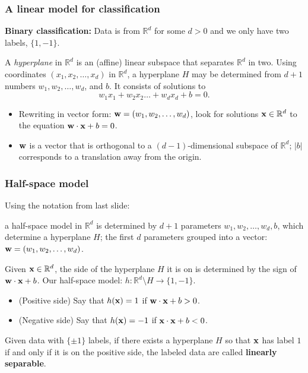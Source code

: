 \documentclass{beamer}
\theoremstyle{example}
\begin{document}
\begin{frame}
    \frametitle{A linear model for classification}
    \textbf{Binary classification:} Data is from $\mathbb R^d$ for some $d>0$ and we only have two labels, $\{1, -1\}$. %
        
        A \emph{hyperplane} in $\mathbb R^d$ is an (affine) linear subspace that separates $\mathbb R^d$ in two. %
        Using coordinates $(x_1,x_2, \ldots, x_d)$ in $\mathbb R^d$, a hyperplane $H$ may be determined from $d+1$ numbers $w_1,w_2,\ldots,w_d$, and $b$. It consists of solutions to 
            \[w_1x_1 + w_2x_2\ldots + w_dx_d + b = 0.\]

    \begin{itemize}
        \item Rewriting in vector form: ${\bf w}=(w_1,w_2,\ldots,w_d)$, look for solutions ${\bf x}\in\mathbb R^d$ to the equation ${\bf w}\cdot{\bf x} + b = 0$.
        \pause
        \item ${\bf w}$ is a vector that is orthogonal to a $(d-1)$-dimensional subspace of $\mathbb R^d$; $|b|$ corresponds to a translation away from the origin.
    \end{itemize}
    \vfill

\end{frame}

\begin{frame}
\frametitle{Half-space model}
    Using the notation from last slide: 
    
    a half-space model in $\mathbb R^d$ is determined by $d+1$ parameters $w_1,w_2,\ldots,w_d,b$, which determine a hyperplane $H$; the first $d$ parameters grouped into a vector: ${\bf w} = (w_1,w_2,\ldots,w_d)$.
    
    \pause
    Given ${\bf x}\in \mathbb R^d$, the side of the hyperplane $H$ it is on is determined by the sign of ${\bf w}\cdot{\bf x} + b$. Our half-space model: $h:\mathbb R^d\setminus H \to \{1,-1\}$.
    \pause
    \begin{itemize}
        \item (Positive side) Say that $h({\bf x}) = 1$ if ${\bf w}\cdot{\bf x}+b > 0$.
        \item (Negative side) Say that $h({\bf x}) = -1$ if ${\bf x}\cdot{\bf x}+b < 0$. 
    \end{itemize}

    \pause
    Given data with $\{\pm1\}$ labels, if there exists a hyperplane $H$ so that ${\bf x}$ has label $1$ if and only if it is on the positive side, the labeled data are called \textbf{linearly separable}. 

\end{frame}
\end{document}
